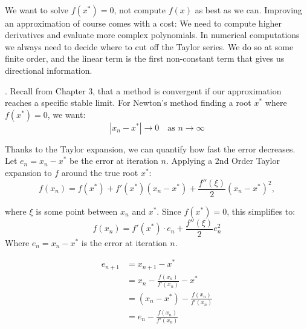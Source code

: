 


 \\
We want to solve $f(x^*) = 0$, not compute $f(x)$ as best as we can.
Improving an approximation of course comes with a cost: We need to compute higher derivatives 
and evaluate more complex polynomials.
In numerical computations we always need to decide where to cut off the Taylor series. 
We do so at some finite order, and the linear term is the first non-constant term that 
gives us directional information.


. Recall from Chapter 3, that a method is convergent if our approximation reaches a specific stable limit. 
For Newton's method finding a root $x^*$ where $f(x^*) = 0$, we want:
\begin{equation}
    |x_n - x^*| \to 0 \quad \text{as } n \to \infty
\end{equation}

Thanks to the Taylor expansion, we can quantify how fast the error decreases.\\

Let $e_n = x_n - x^*$ be the error at iteration $n$. 
Applying a 2nd Order Taylor expansion to $f$ around the true root $x^*$:
\begin{equation}
    f(x_n) = f(x^*) + f'(x^*)(x_n - x^*) + \frac{f''(\xi)}{2}(x_n - x^*)^2,
\end{equation}

where $\xi$ is some point between $x_n$ and $x^*$. Since $f(x^*) = 0$, this simplifies to:
\begin{equation}
    f(x_n) = f'(x^*) \cdot e_n + \frac{f''(\xi)}{2} e_n^2
\end{equation}
Where $e_n = x_n - x^*$ is the error at iteration $n$.

\begin{align*}
    e_{n+1} &= x_{n+1} - x^* \\
    &= x_n - \frac{f(x_n)}{f'(x_n)} - x^* \\
    &= (x_n - x^*) - \frac{f(x_n)}{f'(x_n)} \\
    &= e_n - \frac{f(x_n)}{f'(x_n)}
\end{align*}

